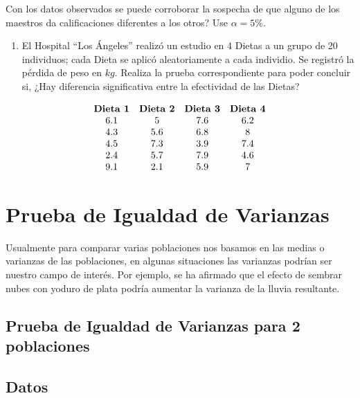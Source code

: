 \documentclass[
  a4paper,
  oneside,
  openany]{book}
\providecommand{\tightlist}{%
  \setlength{\itemsep}{0pt}\setlength{\parskip}{0pt}}
\begin{document}
Con los datos observados se puede corroborar la sospecha de que alguno de los maestros da calificaciones diferentes a los otros? Use \(\alpha=5\%.\)

\begin{enumerate}
\def\labelenumi{\arabic{enumi}.}
\setcounter{enumi}{2}
\tightlist
\item
  El Hospital ``Los Ángeles'' realizó un estudio en 4 Dietas a un grupo de 20 individuos; cada Dieta se aplicó aleatoriamente a cada individio. Se registró la pérdida de peso en \(kg\).
  Realiza la prueba correspondiente para poder concluir si, ¿Hay diferencia significativa entre la efectividad de las Dietas?
\end{enumerate}

\[
\begin{array}{c c c c} 
\textbf{Dieta 1} & \textbf{Dieta 2} & \textbf{Dieta 3} & \textbf{Dieta 4}\\
6.1&5&7.6&6.2\\
4.3&5.6&6.8&8\\
4.5&7.3&3.9&7.4\\
2.4&5.7&7.9&4.6\\
9.1&2.1&5.9&7\\
\end{array}
\]

\hypertarget{prueba-de-igualdad-de-varianzas}{%
\chapter{Prueba de Igualdad de Varianzas}\label{prueba-de-igualdad-de-varianzas}}

Usualmente para comparar varias poblaciones nos basamos en las medias o varianzas de las poblaciones, en algunas situaciones las varianzas podrían ser nuestro campo de interés. Por ejemplo, se ha afirmado que el efecto de sembrar nubes con yoduro de plata podría aumentar la varianza de la lluvia resultante.

\hypertarget{prueba-de-igualdad-de-varianzas-para-2-poblaciones}{%
\section*{Prueba de Igualdad de Varianzas para 2 poblaciones}\label{prueba-de-igualdad-de-varianzas-para-2-poblaciones}}


\hypertarget{datos-8}{%
\section{Datos}\label{datos-8}}
\end{document}
